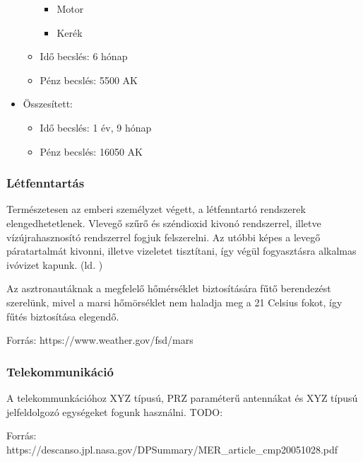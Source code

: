 \documentclass[12pt]{report}
\begin{document}
\begin{itemize}
\begin{itemize}
                \begin{itemize}
                    \item Motor
                    \item Kerék
                \end{itemize}
            \item Idő becslés: 6 hónap
            \item Pénz becslés: 5500 AK
        \end{itemize}
    \item Összesített:
        \begin{itemize}
            \item Idő becslés: 1 év, 9 hónap
            \item Pénz becslés: 16050 AK
        \end{itemize}
\end{itemize}

\subsubsection{Létfenntartás}

Természetesen az emberi személyzet végett, a létfenntartó rendszerek elengedhetetlenek. Vlevegő szűrő és széndioxid kivonó rendszerrel, illetve vízújrahasznosító rendszerrel fogjuk felszerelni. Az utóbbi képes a levegő páratartalmát kivonni, illetve vizeletet tisztítani, így végül fogyasztásra alkalmas ivóvizet kapunk. (ld. )

Az asztronautáknak a megfelelő hőmérséklet biztosítására fűtő berendezést szerelünk, mivel a marsi hőmörséklet nem haladja meg a 21 Celsius fokot, így fűtés biztosítása elegendő.

Forrás: https://www.weather.gov/fsd/mars


\subsubsection{Telekommunikáció}

A telekommunkációhoz XYZ típusú, PRZ paraméterű antennákat és XYZ típusú jelfeldolgozó egységeket fogunk használni. TODO:

Forrás: https://descanso.jpl.nasa.gov/DPSummary/MER\_article\_cmp20051028.pdf
\end{document}
